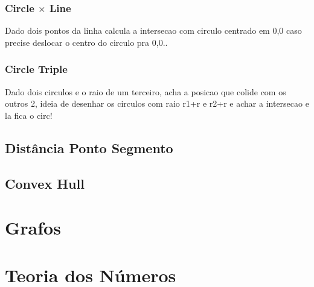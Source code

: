 \documentclass{report}
\begin{document}
\subsection{Circle $\times$ Line}
 Dado dois pontos da linha calcula a intersecao com circulo centrado em 0,0
   caso precise deslocar o centro do circulo pra 0,0.. 
%
\subsection{Circle Triple}
 Dado dois circulos e o raio de um terceiro, acha a posicao que colide com os outros 2, 
   ideia de desenhar os circulos com raio r1+r e r2+r e achar a intersecao e la fica o circ! 
%
\section{Distância Ponto Segmento}
%
\section{Convex Hull}
\chapter{Grafos}

\chapter{Teoria dos Números}
\end{document}
